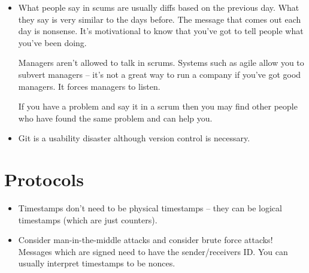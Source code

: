 \documentclass[10pt, a4paper]{article}
\begin{document}
\begin{itemize}
\item What people say in scums are usually diffs based on the previous day.
What they say is very similar to the days before. The message that comes out
each day is nonsense. It's motivational to know that you've got to tell
people what you've been doing.

Managers aren't allowed to talk in scrums. Systems such as agile allow you to
subvert managers -- it's not a great way to run a company if you've got good managers.
It forces managers to listen.

If you have a problem and say it in a scrum then you may find other people who
have found the same problem and can help you.

\item Git is a usability disaster although version control is necessary.

\end{itemize}

\section{Protocols}

\begin{itemize}

\item Timestamps don't need to be physical timestamps -- they can be logical timestamps
(which are just counters).

\item Consider man-in-the-middle attacks and consider brute force attacks!
Messages which are signed need to have the sender/receivers ID. You can usually
interpret timestamps to be nonces.

\end{itemize}
\end{document}
